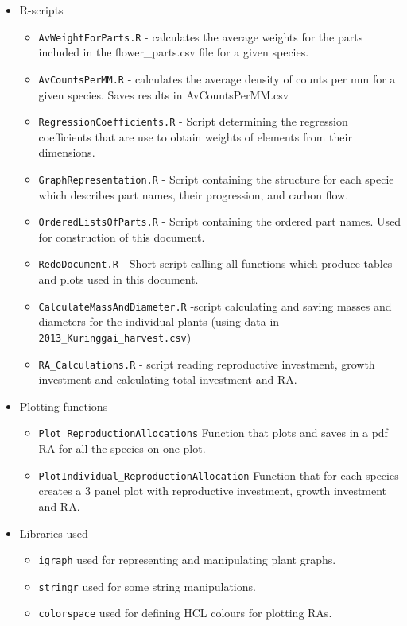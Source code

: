 \documentclass[10pt]{book} %
\begin{document}
\begin{itemize}
\begin{itemize}
\end{itemize}
\item{R-scripts}
\begin{itemize}
\item \texttt{AvWeightForParts.R} - calculates the average weights for the parts included in the {flower\_parts.csv} file for a given species.
\item \texttt{AvCountsPerMM.R} - calculates the average density of counts per mm for a given species. Saves results in AvCountsPerMM.csv
\item \texttt{RegressionCoefficients.R} - Script determining the regression coefficients that are use to obtain weights of elements from their dimensions.
\item \texttt{GraphRepresentation.R} - Script containing the structure for each specie which describes part names, their progression, and carbon flow.
\item \texttt{OrderedListsOfParts.R} - Script containing the ordered part names. Used for construction of this document.
\item \texttt{RedoDocument.R} - Short script calling all functions which produce tables and plots used in this document.
\item \texttt{CalculateMassAndDiameter.R} -script calculating and saving masses and diameters for the individual plants (using data in \texttt{2013\_Kuringgai\_harvest.csv})
\item \texttt{RA\_Calculations.R} - script reading reproductive investment, growth investment and calculating total investment and RA.
\end{itemize}
\item{Plotting functions}
\begin{itemize}
\item \texttt{Plot\_ReproductionAllocations} Function that plots and saves in a pdf RA for all the species on one plot.
\item \texttt{PlotIndividual\_ReproductionAllocation} Function that for each species creates a 3 panel plot with reproductive investment, growth investment and RA.
\end{itemize}
\item Libraries used
\begin{itemize}
\item \texttt{igraph} used for representing and manipulating plant graphs.
\item \texttt{stringr} used for some string manipulations.
\item \texttt{colorspace} used for defining HCL colours for plotting RAs.
\end{itemize}
\end{itemize}
\end{document}
